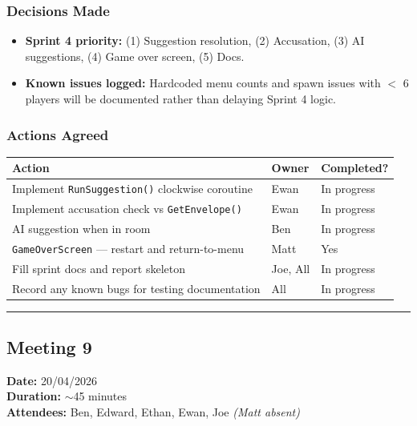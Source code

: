 \subsubsection*{Decisions Made}
\begin{itemize}
    \item \textbf{Sprint 4 priority:} (1) Suggestion resolution, (2) Accusation, (3) AI suggestions, (4) Game over screen, (5) Docs.
    \item \textbf{Known issues logged:} Hardcoded menu counts and spawn issues with $<$ 6 players will be documented rather than delaying Sprint 4 logic.
\end{itemize}

\subsubsection*{Actions Agreed}
\begin{table}[H]
\centering
\begin{tabular}{|p{8cm}|l|l|}
\hline
\textbf{Action} & \textbf{Owner} & \textbf{Completed?} \\ \hline
Implement \texttt{RunSuggestion()} clockwise coroutine & Ewan & In progress \\ \hline
Implement accusation check vs \texttt{GetEnvelope()} & Ewan & In progress \\ \hline
AI suggestion when in room & Ben & In progress \\ \hline
\texttt{GameOverScreen} --- restart and return-to-menu & Matt & Yes \\ \hline
Fill sprint docs and report skeleton & Joe, All & In progress \\ \hline
Record any known bugs for testing documentation & All & In progress \\ \hline
\end{tabular}
\end{table}

\smallskip
\hrule
\smallskip

\subsection{Meeting 9}
\textbf{Date:} 20/04/2026 \\
\textbf{Duration:} $\sim$45 minutes \\
\textbf{Attendees:} Ben, Edward, Ethan, Ewan, Joe \textit{(Matt absent)}

